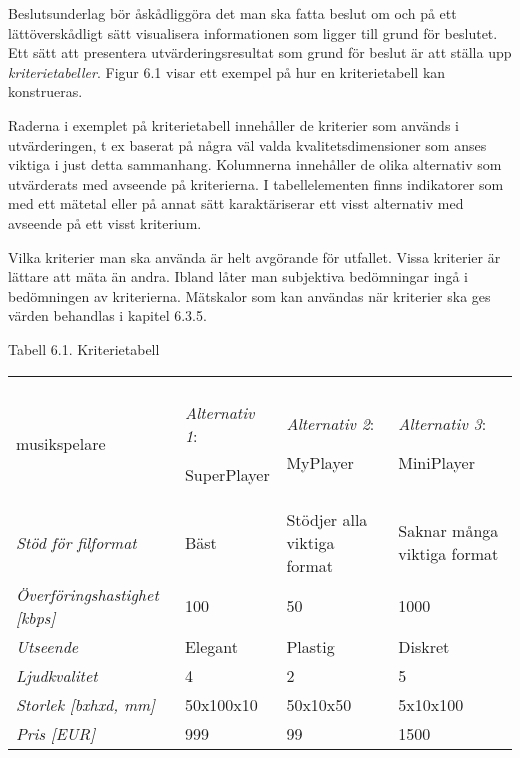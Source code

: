 Beslutsunderlag bör åskådliggöra det man ska fatta beslut om och på ett
lättöverskådligt sätt visualisera informationen som ligger till grund
för beslutet. Ett sätt att presentera utvärderingsresultat som grund för
beslut är att ställa upp \emph{kriterietabeller}. Figur 6.1 visar ett
exempel på hur en kriterietabell kan konstrueras.

Raderna i exemplet på kriterietabell innehåller de kriterier som används
i utvärderingen, t ex baserat på några väl valda kvalitetsdimensioner
som anses viktiga i just detta sammanhang. Kolumnerna innehåller de
olika alternativ som utvärderats med avseende på kriterierna. I
tabellelementen finns indikatorer som med ett mätetal eller på annat
sätt karaktäriserar ett visst alternativ med avseende på ett visst
kriterium.

Vilka kriterier man ska använda är helt avgörande för utfallet. Vissa
kriterier är lättare att mäta än andra. Ibland låter man subjektiva
bedömningar ingå i bedömningen av kriterierna. Mätskalor som kan
användas när kriterier ska ges värden behandlas i kapitel 6.3.5.

Tabell 6.1. Kriterietabell

\begin{longtable}[]{@{}llll@{}}
\toprule
\begin{minipage}[t]{0.24\columnwidth}\raggedright\strut
\textbf{Kvalitetskriterier för\\
musikspelare}\strut
\end{minipage} & \begin{minipage}[t]{0.24\columnwidth}\raggedright\strut
\emph{Alternativ 1}:

SuperPlayer\strut
\end{minipage} & \begin{minipage}[t]{0.24\columnwidth}\raggedright\strut
\emph{Alternativ 2}:

MyPlayer\strut
\end{minipage} & \begin{minipage}[t]{0.24\columnwidth}\raggedright\strut
\emph{Alternativ 3}:

MiniPlayer\strut
\end{minipage}\tabularnewline
\emph{Stöd för filformat} & Bäst & Stödjer alla viktiga format & Saknar
många viktiga format\tabularnewline
\emph{Överföringshastighet {[}kbps{]}} & 100 & 50 & 1000\tabularnewline
\emph{Utseende} & Elegant & Plastig & Diskret\tabularnewline
\emph{Ljudkvalitet} & 4 & 2 & 5\tabularnewline
\emph{Storlek {[}bxhxd, mm{]}} & 50x100x10 & 50x10x50 &
5x10x100\tabularnewline
\emph{Pris {[}EUR{]}} & 999 & 99 & 1500\tabularnewline
\bottomrule
\end{longtable}

